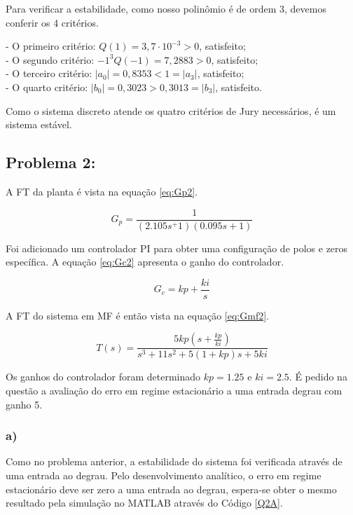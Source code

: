 Para verificar a estabilidade, como nosso polinômio é de ordem 3, devemos conferir os 4 critérios.

- O primeiro critério: $Q(1)= 3,7 \cdot 10^{-3} > 0$, satisfeito; \\
- O segundo critério: $-1^3 Q(-1) = 7,2883 > 0$, satisfeito;\\
- O terceiro critério: $|a_0| = 0,8353 < 1 = |a_3|$, satisfeito; \\
- O quarto critério: $|b_0| = 0,3023 > 0,3013 = |b_3| $, satisfeito. 

Como o sistema discreto atende os quatro critérios de Jury necessários, é um sistema estável.

\subsection*{Problema 2:}

    A FT da planta é vista na equação \ref{eq:Gp2}. 

    \begin{equation}
        G_p = \frac{1}{(2.105s^+1)(0.095s+1)}
        \label{eq:Gp2}
    \end{equation}

    Foi adicionado um controlador PI para obter uma configuração de polos e zeros específica. A equação \ref{eq:Gc2} apresenta
    o ganho do controlador. 

    \begin{equation}
        G_c = kp + \frac{ki}{s}
        \label{eq:Gc2}
    \end{equation}

    A FT do sistema em MF é então vista na equação \ref{eq:Gmf2}.

    \begin{equation}
        T(s) = \frac{5kp(s+\frac{kp}{ki})}{s^3+11s^2+5(1+kp)s+5ki}
        \label{eq:Gmf2}
    \end{equation}

    Os ganhos do controlador foram determinado $kp=1.25$ e $ki = 2.5$. É pedido na questão a avaliação do erro em regime
    estacionário a uma entrada degrau com ganho 5. 

    \subsubsection*{a)}
        Como no problema anterior, a estabilidade do sistema foi verificada através de uma entrada ao degrau. 
        Pelo desenvolvimento analítico, o erro em regime estacionário deve ser zero a uma entrada ao degrau, 
        espera-se obter o mesmo resultado pela simulação no MATLAB através do Código \ref{Q2A}.

